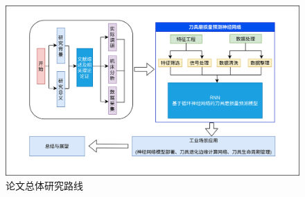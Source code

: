 \begin{figure}[htp]
    \centering
    \includegraphics[width=14cm]{Chapter1/OpenIE研究架构.png}
    \caption{论文总体研究路线}
\end{figure}

